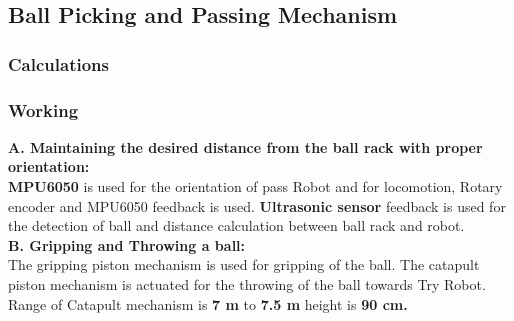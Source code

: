     \subsection{Ball Picking and Passing Mechanism}
        \subsubsection{Calculations}


        \subsubsection{Working}
            \textbf{A. Maintaining the desired distance from the ball rack with proper orientation:}                                   \\
            \textbf{MPU6050} is used for the orientation of pass Robot and for locomotion, Rotary encoder and MPU6050 feedback is used. \textbf{Ultrasonic sensor} 
            feedback is used for the detection of ball and distance calculation between ball rack and robot.                                                                                                                     \\
            \textbf{B. Gripping and Throwing a ball:}                                                                                  \\
            The gripping piston mechanism is used for gripping of the ball. The catapult piston mechanism is actuated for the
            throwing of the ball towards Try Robot. Range of Catapult mechanism is \textbf{7 m} to \textbf{7.5 m} height is \textbf{90 cm.}

